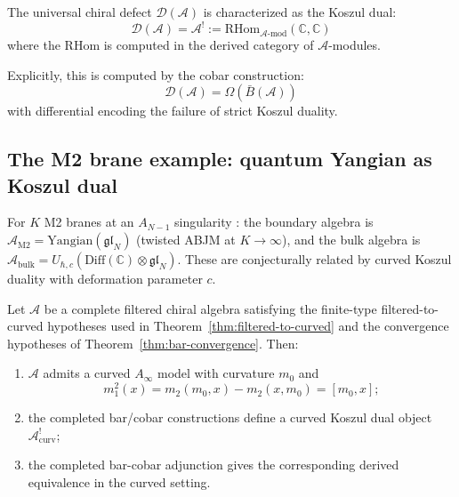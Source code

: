 \begin{theorem}[Universal defect = Koszul dual {\cite{LV12, Positselski11}}; \ClaimStatusProvedElsewhere]\label{thm:defect-koszul}
The universal chiral defect $\mathcal{D}(\mathcal{A})$ is characterized as the Koszul dual:
\[\mathcal{D}(\mathcal{A}) = \mathcal{A}^! := \text{RHom}_{\mathcal{A}\text{-mod}}(\mathbb{C}, \mathbb{C})\]
where the RHom is computed in the derived category of $\mathcal{A}$-modules.

Explicitly, this is computed by the cobar construction:
\[\mathcal{D}(\mathcal{A}) = \Omega(\bar{B}(\mathcal{A}))\]
with differential encoding the failure of strict Koszul duality.
\end{theorem}

\subsection{The M2 brane example: quantum Yangian as Koszul dual}

\begin{example}\label{ex:M2-brane}
For $K$ M2 branes at an $A_{N-1}$ singularity \cite{Costello-1705.02500v1}: the boundary algebra is $\mathcal{A}_{\mathrm{M2}} = \mathrm{Yangian}(\mathfrak{gl}_N)$ (twisted ABJM at $K \to \infty$), and the bulk algebra is $\mathcal{A}_{\mathrm{bulk}} = U_{\hbar,c}(\mathrm{Diff}(\mathbb{C}) \otimes \mathfrak{gl}_N)$.  These are conjecturally related by curved Koszul duality with deformation parameter $c$.
\end{example}

\begin{theorem}\label{thm:curved-koszul}
Let $\mathcal{A}$ be a complete filtered chiral algebra satisfying the finite-type
filtered-to-curved hypotheses used in
Theorem~\ref{thm:filtered-to-curved} and the convergence hypotheses of
Theorem~\ref{thm:bar-convergence}. Then:
\begin{enumerate}
\item $\mathcal{A}$ admits a curved $A_\infty$ model with curvature $m_0$ and
\[
m_1^2(x)=m_2(m_0,x)-m_2(x,m_0)=[m_0,x];
\]
\item the completed bar/cobar constructions define a curved Koszul dual object
$\mathcal{A}_{\mathrm{curv}}^!$;
\item the completed bar-cobar adjunction gives the corresponding derived
equivalence in the curved setting.
\end{enumerate}
\end{theorem}



